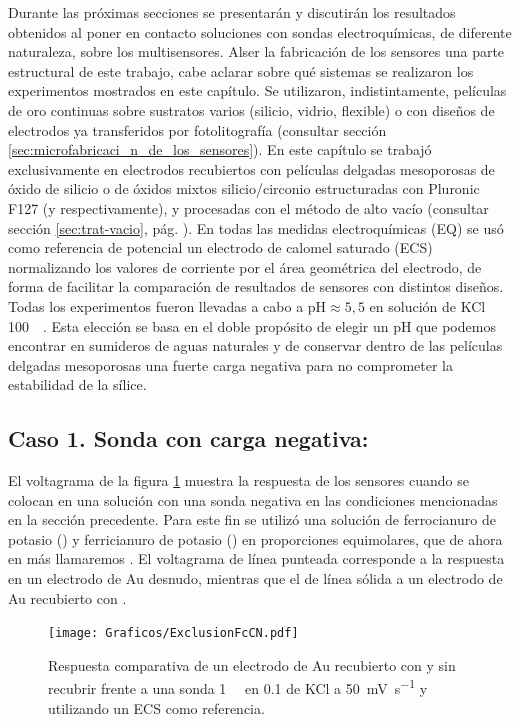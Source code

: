 	 Durante las próximas secciones se presentarán y discutirán los resultados obtenidos al poner en contacto soluciones con sondas electroquímicas, de diferente naturaleza, sobre los multisensores. Al\space ser la fabricación de los sensores una parte estructural de este trabajo, cabe aclarar sobre qué sistemas se realizaron los experimentos mostrados en este capítulo. Se utilizaron, indistintamente, películas de oro continuas sobre sustratos varios (silicio, vidrio, flexible) o con diseños de electrodos ya transferidos por fotolitografía (consultar sección \ref{sec:microfabricaci_n_de_los_sensores}). En este capítulo se trabajó exclusivamente en electrodos recubiertos con películas delgadas mesoporosas de óxido de silicio o de óxidos mixtos silicio/circonio estructuradas con Pluronic F127 (\pdmF\space y \pdmZ\space respectivamente), y procesadas con el método de alto vacío (consultar sección \ref{sec:trat-vacio}, pág. \pageref{sec:trat-vacio}). En todas las medidas electroquímicas (EQ) se usó como referencia de potencial un electrodo de calomel saturado (ECS) normalizando los valores de corriente por el área geométrica del electrodo, de forma de facilitar la comparación de resultados de sensores con distintos diseños. Todas los experimentos fueron llevadas a cabo a $\text{pH}\approx5,5$ en solución de KCl \SI{100}{\milli\Molar}. Esta elección se basa en el doble propósito de elegir un pH que podemos encontrar en sumideros de aguas naturales y de conservar dentro de las películas delgadas mesoporosas una fuerte carga negativa para no comprometer la estabilidad de la sílice.

	\subsection{Caso 1. Sonda con carga negativa: \texorpdfstring{\ferroferri}{ferroferri}}

	 El voltagrama de la figura \ref{fig:exclusion_vs_Au} muestra la respuesta de los sensores cuando se colocan en una solución con una sonda negativa en las condiciones mencionadas en la sección precedente. Para este fin se utilizó una solución de ferrocianuro de potasio (\ferroCompleto) y ferricianuro de potasio (\ferriCompleto) en proporciones equimolares, que de ahora en más llamaremos \fe. El voltagrama de línea punteada corresponde a la respuesta en un electrodo de Au desnudo, mientras que el de línea sólida a un electrodo de Au recubierto con \pdmF.
	
			\begin{figure}[ht]
				\centering
		 	    \texttt{[image: Graficos/ExclusionFcCN.pdf]}
		        \caption[Exclusión electrostática en \pdmF]{Respuesta comparativa de un electrodo de Au recubierto con \pdmF\space y sin recubrir frente a una sonda \fe\space \SI{1}{\milli\Molar} en \SI{0.1}{\Molar} de KCl a \SI{50}{\milli\volt\per\second} y utilizando un ECS como referencia.}
		        \label{fig:exclusion_vs_Au}
		      	\end{figure}
	
